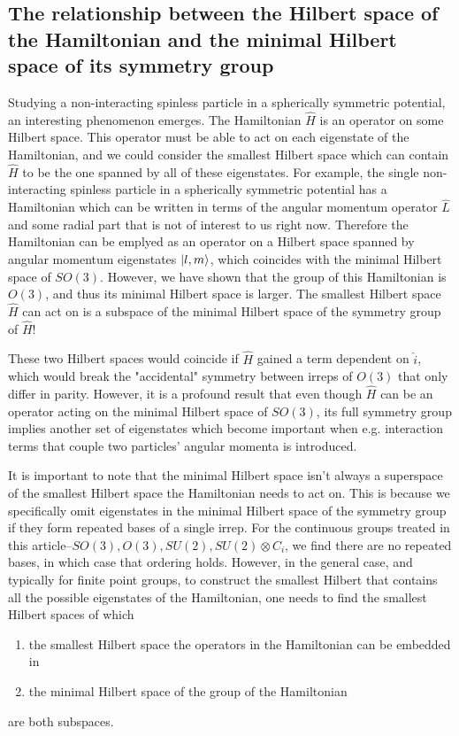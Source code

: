 \documentclass[12pt]{article}
\begin{document}
	\subsection{The relationship between the Hilbert space of the Hamiltonian and the minimal Hilbert space of its symmetry group}
	
	Studying a non-interacting spinless particle in a spherically symmetric potential, an interesting phenomenon emerges. The Hamiltonian $\hat{H}$ is an operator on some Hilbert space. This operator must be able to act on each eigenstate of the Hamiltonian, and we could consider the smallest Hilbert space which can contain $\hat{H}$ to be the one spanned by all of these eigenstates. For example, the single non-interacting spinless particle in a spherically symmetric potential has a Hamiltonian which can be written in terms of the angular momentum operator $\hat{L}$ and some radial part that is not of interest to us right now. Therefore the Hamiltonian can be emplyed as an operator on a Hilbert space spanned by angular momentum eigenstates $\ket{l,m}$, which coincides with the minimal Hilbert space of $SO(3)$. However, we have shown that the group of this Hamiltonian is $O(3)$, and thus its minimal Hilbert space is larger. The smallest Hilbert space $\hat{H}$ can act on is a subspace of the minimal Hilbert space of the symmetry group of $\hat{H}$!
	
	These two Hilbert spaces would coincide if $\hat{H}$ gained a term dependent on $\hat{i}$, which would break the "accidental" symmetry between irreps of $O(3)$ that only differ in parity. However, it is a profound result that even though $\hat{H}$ can be an operator acting on the minimal Hilbert space of $SO(3)$, its full symmetry group implies another set of eigenstates which become important when e.g. interaction terms that couple two particles' angular momenta is introduced.
	
	It is important to note that the minimal Hilbert space isn't always a superspace of the smallest Hilbert space the Hamiltonian needs to act on. This is because we specifically omit eigenstates in the minimal Hilbert space of the symmetry group if they form repeated bases of a single irrep. For the continuous groups treated in this article--$SO(3),O(3),SU(2),SU(2)\otimes C_i$, we find there are no repeated bases, in which case that ordering holds. However, in the general case, and typically for finite point groups, to construct the smallest Hilbert that contains all the possible eigenstates of the Hamiltonian, one needs to find the smallest Hilbert spaces of which
	\begin{enumerate}
	\item the smallest Hilbert space the operators in the Hamiltonian can be embedded in
	\item the minimal Hilbert space of the group of the Hamiltonian
	\end{enumerate}
	are both subspaces.
\end{document}
